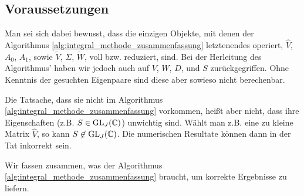 \subsection*{Voraussetzungen}

Man sei sich dabei bewusst, dass die einzigen Objekte, mit denen der Algorithmus \ref{alg:integral_methode_zusammenfassung} letztenendes operiert, $\hat V$, $A_0$, $A_1$, sowie $\tilde V$, $\Sigma$, $\tilde W$, voll bzw. reduziert, sind.
Bei der Herleitung des Algorithmus' haben wir jedoch auch auf $V$, $W$, $D$, und $S$ zurückgegriffen.
Ohne Kenntnis der gesuchten Eigenpaare sind diese aber sowieso nicht berechenbar.

Die Tatsache, dass sie nicht im Algorithmus \ref{alg:integral_methode_zusammenfassung} vorkommen, heißt aber nicht, dass ihre Eigenschaften (z.B. $S \in \operatorname{GL}_J(\mathbb{C})$) unwichtig sind.
Wählt man z.B. eine zu kleine Matrix $\hat V$, so kann $S \not \in \operatorname{GL}_J(\mathbb{C})$.
Die numerischen Resultate können dann in der Tat inkorrekt sein.

Wir fassen zusammen, was der Algorithmus \ref{alg:integral_methode_zusammenfassung} braucht, um korrekte Ergebnisse zu liefern.

